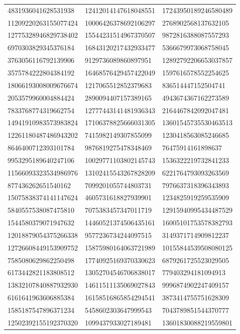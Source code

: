 \begin{longtable}{*{3}{l}}
4831936041628531938&12412014147618048551&17243950189246580489\\
11209220263155077424&10006426378692106297&2768902568137632105\\
12775328946829738402&15544231514967370507&9872816388087557293\\
6970303829345376184&16843120217432933477&5366679973068758045\\
3763056116792139906&9129736089860897951&12892792206653037857\\
3575784222804384192&16468576429457422049&1597616578552254625\\
18066193008009676674&1217065512852379683&836514447152504741\\
2053579960004884424&2890094407157389165&4943674367162273589\\
7833768774319662754&12777443141481936343&2164467842092047481\\
14941910983573983824&17106378825666031305&13601545735530463513\\
12261180487486943202&7415982149307855099&1230418563085246685\\
8646400712393101784&9876819275478348469&76475914161898637\\
9953295189640247106&10029771103802145743&1536322219732841233\\
11566093323534986976&13102415543267828209&6221764793093263569\\
877436262651540162&7099201055744803731&7976637318396343893\\
15075838374141147624&4605731618827939901&1234825919259535909\\
5840557538087475810&7075383457347011719&12915940995434487529\\
1544580379071947632&14460521374506435161&16005101753578382793\\
12018879054375266338&9577236734244097515&3149371714909812237\\
12726608449153909752&15875980164063721989&10155844539508080125\\
7585080629862250498&17740925169370330623&6879261725523029505\\
6173442821183808512&13052704546706838017&779403294181094913\\
13832107840887932930&14611511135069027843&9996874902247409157\\
6161641963606885384&16158516865854294541&3873414755751628309\\
1585187547896371234&5458602303647999543&7043789851544370777\\
12502392155192370320&1099437933027189481&13601830088219559801\\

\end{longtable}
